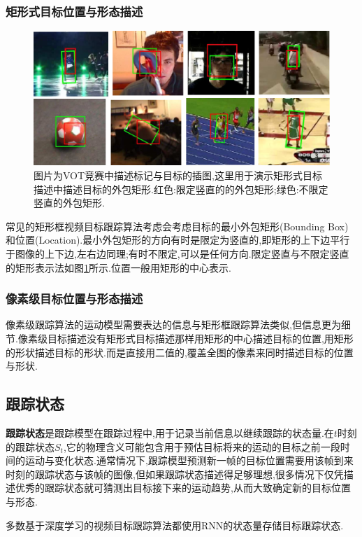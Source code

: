 \subsubsection{矩形式目标位置与形态描述}
\par
\begin{figure}[htbp!]
    \centering
    \includegraphics[width = 1.\textwidth]{chap/img/overlap_examples.pdf}
    \caption{图片为VOT竞赛中描述标记与目标的插图\supercite{VOT_TPAMI},这里用于演示矩形式目标描述中描述目标的外包矩形.红色:限定竖直的的外包矩形;绿色:不限定竖直的外包矩形.}
    \label{fig:bunding_boxes}
\end{figure}
\par
常见的矩形框视频目标跟踪算法考虑会考虑目标的最小外包矩形(Bounding Box)和位置(Location).最小外包矩形的方向有时是限定为竖直的,即矩形的上下边平行于图像的上下边,左右边同理;有时不限定,可以是任何方向.限定竖直与不限定竖直的矩形表示法如图\ref{fig:bunding_boxes}所示.位置一般用矩形的中心表示.
\par
\subsubsection{像素级目标位置与形态描述}
像素级跟踪算法的运动模型需要表达的信息与矩形框跟踪算法类似,但信息更为细节.像素级目标描述没有矩形式目标描述那样用矩形的中心描述目标的位置,用矩形的形状描述目标的形状.而是直接用二值的,覆盖全图的像素来同时描述目标的位置与形状.

\subsection{跟踪状态}
\textbf{跟踪状态}是跟踪模型在跟踪过程中,用于记录当前信息以继续跟踪的状态量.在$t$时刻的跟踪状态$S_t$,它的物理含义可能包含用于预估目标将来的运动的目标之前一段时间的运动与变化状态.通常情况下,跟踪模型预测新一帧的目标位置需要用该帧到来时刻的跟踪状态与该帧的图像,但如果跟踪状态描述得足够理想,很多情况下仅凭描述优秀的跟踪状态就可猜测出目标接下来的运动趋势,从而大致确定新的目标位置与形态.
\par
多数基于深度学习的视频目标跟踪算法都使用RNN的状态量存储目标跟踪状态.
\par

